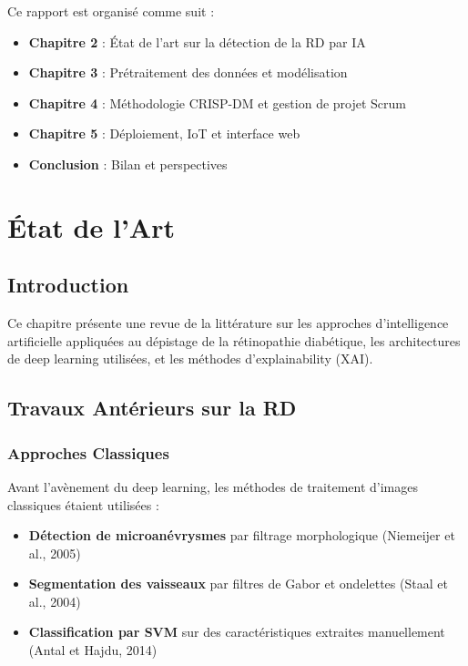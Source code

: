 \documentclass[12pt,a4paper,oneside]{report}
\begin{document}
Ce rapport est organisé comme suit :
\begin{itemize}
    \item \textbf{Chapitre 2} : État de l'art sur la détection de la RD par IA
    \item \textbf{Chapitre 3} : Prétraitement des données et modélisation
    \item \textbf{Chapitre 4} : Méthodologie CRISP-DM et gestion de projet Scrum
    \item \textbf{Chapitre 5} : Déploiement, IoT et interface web
    \item \textbf{Conclusion} : Bilan et perspectives
\end{itemize}

\newpage

\chapter{État de l'Art}

\section{Introduction}

Ce chapitre présente une revue de la littérature sur les approches
d'intelligence artificielle appliquées au dépistage de la rétinopathie
diabétique, les architectures de deep learning utilisées, et les méthodes
d'explainability (XAI).

\section{Travaux Antérieurs sur la RD}

\subsection{Approches Classiques}

Avant l'avènement du deep learning, les méthodes de traitement d'images
classiques étaient utilisées :

\begin{itemize}
    \item \textbf{Détection de microanévrysmes} par filtrage morphologique
          (Niemeijer et al., 2005)
    \item \textbf{Segmentation des vaisseaux} par filtres de Gabor et
          ondelettes (Staal et al., 2004)
    \item \textbf{Classification par SVM} sur des caractéristiques
          extraites manuellement (Antal et Hajdu, 2014)
\end{itemize}
\end{document}
